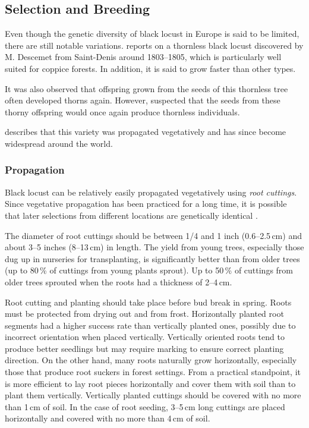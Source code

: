 \subsection{Selection and Breeding}

Even though the genetic diversity of black locust in Europe is said to be limited, there are still notable variations. \citet[pp.~259--260]{Michaux1813arbres} reports on a thornless black locust discovered by M. Descemet from Saint-Denis around 1803–1805, which is particularly well suited for coppice forests. In addition, it is said to grow faster than other types.

It was also observed that offspring grown from the seeds of this thornless tree often developed thorns again. However, \citet{Michaux1813arbres} suspected that the seeds from these thorny offspring would once again produce thornless individuals.

\citet[p.~173]{quatrefages1861robinie} describes that this variety was propagated vegetatively and has since become widespread around the world.


\subsubsection{Propagation}

Black locust can be relatively easily propagated vegetatively using \emph{root cuttings}. Since vegetative propagation has been practiced for a long time, it is possible that later selections from different locations are genetically identical \citep{liesebach2012robinie}.

The diameter of root cuttings should be between 1/4 and 1 inch (0.6–2.5\,cm) and about 3–5 inches (8–13\,cm) in length. The yield from young trees, especially those dug up in nurseries for transplanting, is significantly better than from older trees (up to 80\,\% of cuttings from young plants sprout). Up to 50\,\% of cuttings from older trees sprouted when the roots had a thickness of 2–4\,cm.

Root cutting and planting should take place before bud break in spring. Roots must be protected from drying out and from frost. Horizontally planted root segments had a higher success rate than vertically planted ones, possibly due to incorrect orientation when placed vertically. Vertically oriented roots tend to produce better seedlings but may require marking to ensure correct planting direction. On the other hand, many roots naturally grow horizontally, especially those that produce root suckers in forest settings. From a practical standpoint, it is more efficient to lay root pieces horizontally and cover them with soil than to plant them vertically. Vertically planted cuttings should be covered with no more than 1\,cm of soil. In the case of root seeding, 3–5\,cm long cuttings are placed horizontally and covered with no more than 4\,cm of soil.

